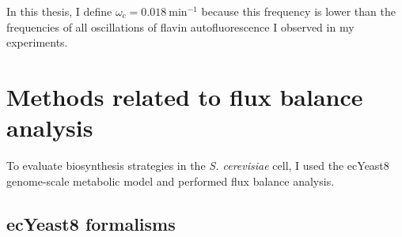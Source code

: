 In this thesis, I define $\omega_{c} = \SI{0.018}{\minute^{-1}}$ because this frequency is lower than the frequencies of all oscillations of flavin autofluorescence I observed in my experiments.


\section{Methods related to flux balance analysis}
\label{sec:methods-fba}

To evaluate biosynthesis strategies in the \textit{S. cerevisiae} cell, I used the ecYeast8 \parencite{luConsensusCerevisiaeMetabolic2019} genome-scale metabolic model and performed flux balance analysis.

\subsection{ecYeast8 formalisms}
\label{subsec:methods-fba-ecYeast8}

